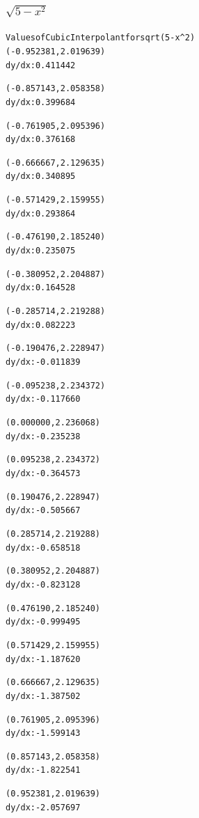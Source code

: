 \documentclass[11pt]{article} %
\begin{document}
\subsubsection*{$\sqrt{5-x^2}$}
\begin{alltt}
 Values of Cubic Interpolant for sqrt(5-x^2)
(-0.952381, 2.019639)
 dy/dx:	0.411442

(-0.857143, 2.058358)
 dy/dx:	0.399684

(-0.761905, 2.095396)
 dy/dx:	0.376168

(-0.666667, 2.129635)
 dy/dx:	0.340895

(-0.571429, 2.159955)
 dy/dx:	0.293864

(-0.476190, 2.185240)
 dy/dx:	0.235075

(-0.380952, 2.204887)
 dy/dx:	0.164528

(-0.285714, 2.219288)
 dy/dx:	0.082223

(-0.190476, 2.228947)
 dy/dx:	-0.011839

(-0.095238, 2.234372)
 dy/dx:	-0.117660

(0.000000, 2.236068)
 dy/dx:	-0.235238

(0.095238, 2.234372)
 dy/dx:	-0.364573

(0.190476, 2.228947)
 dy/dx:	-0.505667

(0.285714, 2.219288)
 dy/dx:	-0.658518

(0.380952, 2.204887)
 dy/dx:	-0.823128

(0.476190, 2.185240)
 dy/dx:	-0.999495

(0.571429, 2.159955)
 dy/dx:	-1.187620

(0.666667, 2.129635)
 dy/dx:	-1.387502

(0.761905, 2.095396)
 dy/dx:	-1.599143

(0.857143, 2.058358)
 dy/dx:	-1.822541

(0.952381, 2.019639)
 dy/dx:	-2.057697

\end{alltt}
\end{document}
